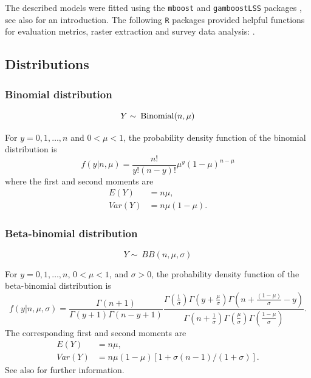 The described models were fitted using the {\tt mboost} and {\tt gamboostLSS} packages \autocite{hothornMboostModelBasedBoosting2022, hofnerGamboostLSSPackageModel2016}, see also \textcite{hothornModelbasedBoosting2010} for an introduction. The following {\tt R} packages provided helpful functions for evaluation metrics, raster extraction and survey data analysis: \textcite{hamnerMetricsEvaluationMetrics2018, pfefferMalariaAtlasInterfaceGlobal2018, watsonRdhsPackageInteract2019, lumleySurveyAnalysisComplex2020, hijmansGeodataDownloadGeographic2022, bastonExactextractrFastExtraction2022}. 


\subsection{Distributions}
\label{appendix_distributions}

\subsubsection*{Binomial distribution}

\begin{equation*}
	Y \sim \: \operatorname{Binomial}(n, \mu)
\end{equation*}

For $y = 0, 1, \dots, n$ and $0 < \mu < 1$, the probability density function of the binomial distribution is 
\begin{equation}
	f(y \vert n, \mu) = \frac{n!}{y! (n-y)!} \mu ^y (1 - \mu)^{n-\mu}
\end{equation}
where the first and second moments are
\begin{align*}
	E(Y) &= n\mu, \\
	Var(Y) &= n \mu (1-\mu).
\end{align*}


\subsubsection*{Beta-binomial distribution}

\begin{equation*}
	Y \sim \: BB(n, \mu, \sigma)
\end{equation*}

For $y = 0, 1, \dots, n$, $0 < \mu < 1$, and $\sigma > 0$, the probability density function of the beta-binomial distribution is 
\begin{equation}
	f(y \vert n, \mu, \sigma) = \frac{\Gamma(n + 1)}{\Gamma(y + 1) \Gamma(n - y + 1)}
	\frac{
		\Gamma(\frac{1}{\sigma}) \Gamma(y + \frac{\mu}{\sigma}) \Gamma(n + \frac{(1-\mu)}{\sigma} - y)
	}{
		\Gamma(n + \frac{1}{\sigma}) \Gamma(\frac{\mu}{\sigma}) \Gamma(\frac{1-\mu}{\sigma})
	}.
\end{equation}
The corresponding first and second moments are 
\begin{align*}
	E(Y) &= n \mu, \\
	Var (Y) &= n \mu ( 1- \mu ) [ 1 + \sigma (n - 1) / (1 + \sigma) ].
\end{align*}
See also \textcite{rigbyDistributionsModelingLocation2019} for further information.



